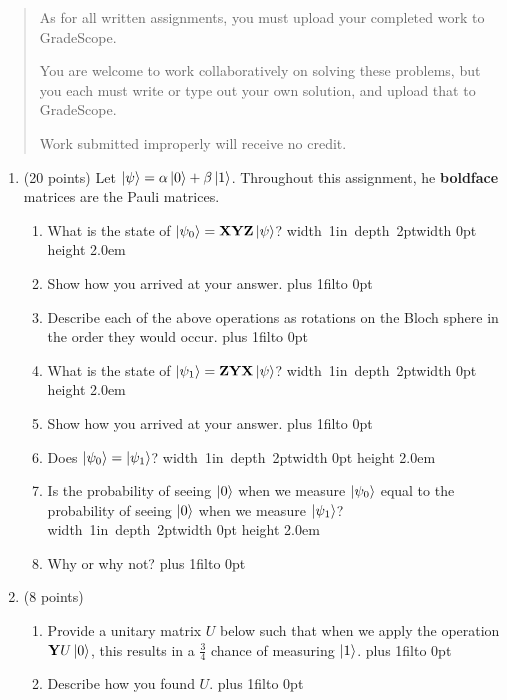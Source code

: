 \documentclass[12pt]{article}
\newcommand{\Blank}{\mbox{\hskip 4pt\vrule width 1in depth 2pt}\vrule width 0pt height 2.0em}
\def\DefaultSpace{1in}
\newcommand{\LeaveSpace}[1][\DefaultSpace]{%
\vskip #1 plus 1fil\relax\hbox to 0pt{\hss} %
}
\begin{document}

\begin{quote}
    As for all written assignments, you must upload your completed work to GradeScope.

    You are welcome to work collaboratively on solving these problems, but you each must write or type out your own solution, and upload that to GradeScope.

    Work submitted improperly will receive no credit.
\end{quote}

\begin{enumerate}[font=\bfseries]
    \item (20 points) Let $\ket{\psi} = \alpha\ket{0} + \beta\ket{1}$. Throughout this assignment, he {\bf boldface} matrices are the Pauli matrices.
    \begin{enumerate}[label=\theenumi.\arabic*]
        \item What is the state of $\ket{\psi_0} = \mathbf{X}\mathbf{Y}\mathbf{Z}\ket{\psi}$? \Blank{}
        \item Show how you arrived at your answer. \LeaveSpace[0.7in]
        \item Describe each of the above operations as rotations on the Bloch sphere in the order they would occur.\LeaveSpace{}
        \item What is the state of $\ket{\psi_1} = \mathbf{Z}\mathbf{Y}\mathbf{X}\ket{\psi}$? \Blank{}
        \item Show how you arrived at your answer. \LeaveSpace[0.6in]
        \item Does $\ket{\psi_0} = \ket{\psi_1}$? \Blank{}
        \item Is the probability of seeing $\ket{0}$ when we measure $\ket{\psi_0}$ equal to the probability of seeing $\ket{0}$ when we measure $\ket{\psi_1}$?\Blank{}
        \item Why or why not? \LeaveSpace{}
    \end{enumerate}
    \item (8 points) 
    \begin{enumerate}[label=\theenumi.\arabic*]
    \item Provide a unitary matrix $U$ below such that when we apply the operation $\mathbf{Y}U\ket{0}$, this results in a $\frac{3}{4}$ chance of measuring $\ket{1}$. \LeaveSpace{}
    \item Describe how you found $U$. \LeaveSpace[2.0in]
    \end{enumerate}

\end{enumerate}
\end{document}
